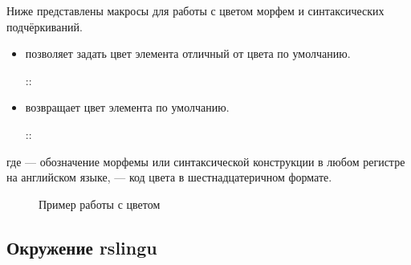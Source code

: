 Ниже представлены макросы для работы с цветом морфем и синтаксических подчёркиваний.
\begin{itemize}
    \item
          \rsName[rsSetColor] позволяет задать цвет элемента отличный от цвета по
          умолчанию.
          \begin{tcolorbox}
              \rsModifier[cmd]
              {}::
              \rsName[rsSetColor]
          \end{tcolorbox}
    \item
          \rsName[rsResetColor] возвращает цвет элемента по умолчанию.
          \begin{tcolorbox}
              \rsModifier[cmd]
              {}::
          \end{tcolorbox}
\end{itemize}

где  --- обозначение морфемы или синтаксической конструкции в любом
регистре на английском языке,  --- код цвета в шестнадцатеричном формате.

\begin{figure}[H]
    \centering
    \begin{minipage}[c]{0.5\textwidth}
        \begin{Latexcode}
        \end{Latexcode}
    \end{minipage}
    \hfill
    \begin{minipage}[c]{0.4\textwidth}
        \small
    \end{minipage}

    \caption{Пример работы с цветом}
\end{figure}




\subsection{Окружение rslingu}

